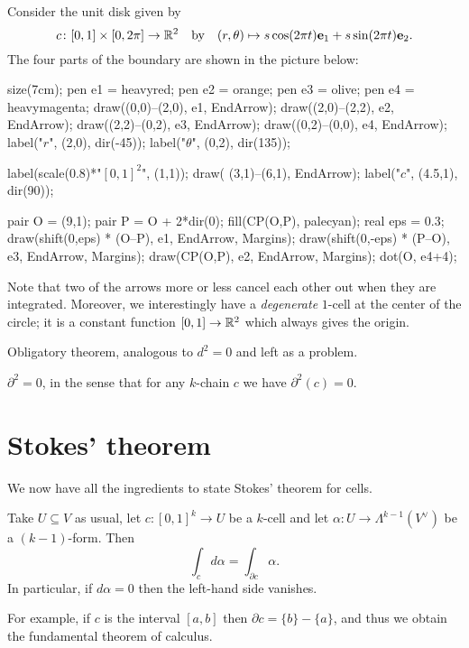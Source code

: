 \begin{example}
	Consider the unit disk given by
	\[ c \colon [0,1] \times [0,2\pi] \to \mathbb R^2 \quad\text{by}\quad
	(r,\theta) \mapsto s\cos(2\pi t)\mathbf e_1 + s\sin(2\pi t)\mathbf e_2. \]
	The four parts of the boundary are shown in the picture below:
	\begin{center}
		\begin{asy}
			size(7cm);
			pen e1 = heavyred;
			pen e2 = orange;
			pen e3 = olive;
			pen e4 = heavymagenta;
			draw((0,0)--(2,0), e1, EndArrow);
			draw((2,0)--(2,2), e2, EndArrow);
			draw((2,2)--(0,2), e3, EndArrow);
			draw((0,2)--(0,0), e4, EndArrow);
			label("$r$", (2,0), dir(-45));
			label("$\theta$", (0,2), dir(135));

			label(scale(0.8)*"$[0,1]^2$", (1,1));
			draw( (3,1)--(6,1), EndArrow);
			label("$c$", (4.5,1), dir(90));

			pair O = (9,1);
			pair P = O + 2*dir(0);
			fill(CP(O,P), palecyan);
			real eps = 0.3;
			draw(shift(0,eps) * (O--P), e1, EndArrow, Margins);
			draw(shift(0,-eps) * (P--O), e3, EndArrow, Margins);
			draw(CP(O,P), e2, EndArrow, Margins);
			dot(O, e4+4);
		\end{asy}
	\end{center}
	Note that two of the arrows more or less cancel each other out when they are integrated.
	Moreover, we interestingly have a \emph{degenerate} $1$-cell at the center of the circle;
	it is a constant function $[0,1] \to \mathbb R^2$ which always gives the origin.
\end{example}

Obligatory theorem, analogous to $d^2=0$ and left as a problem.
\begin{theorem}
	$\partial^2 = 0$, in the sense that for any $k$-chain $c$ we have $\partial^2(c) = 0$.
\end{theorem}

\section{Stokes' theorem}

We now have all the ingredients to state Stokes' theorem for cells.
\begin{theorem}
	Take $U \subseteq V$ as usual, let $c \colon [0,1]^k \to U$ be a $k$-cell
	and let $\alpha \colon U \to \Lambda^{k-1}(V^\vee)$ be a $(k-1)$-form.
	Then
	\[ \int_c d\alpha = \int_{\partial c} \alpha. \]
	In particular, if $d\alpha = 0$ then the left-hand side vanishes.
\end{theorem}
For example, if $c$ is the interval $[a,b]$ then $\partial c = \{b\} - \{a\}$,
and thus we obtain the fundamental theorem of calculus.

